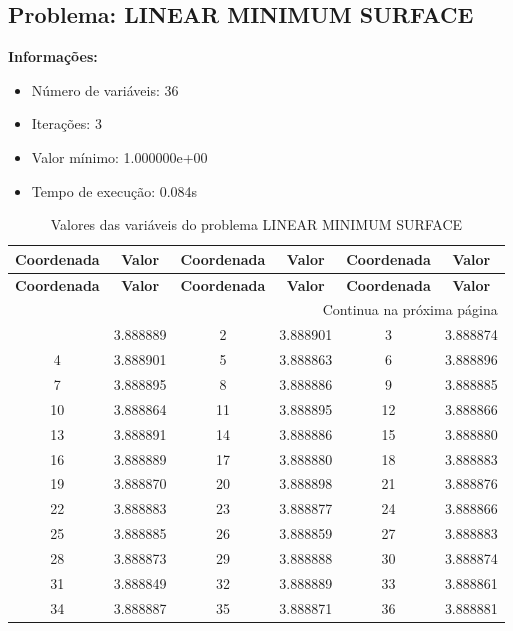 \documentclass[12pt]{article}
\begin{document}
\newpage            
\subsection{Problema: LINEAR MINIMUM SURFACE}

\textbf{Informações:}
\begin{itemize}
\item Número de variáveis: 36
\item Iterações: 3
\item Valor mínimo: 1.000000e+00
\item Tempo de execução: 0.084s
\end{itemize}

\small
\begin{longtable}{@{}cc|cc|cc@{}}
\caption{Valores das variáveis do problema LINEAR MINIMUM SURFACE} \\
\toprule
\textbf{Coordenada} & \textbf{Valor} & \textbf{Coordenada} & \textbf{Valor} & \textbf{Coordenada} & \textbf{Valor} \\
\midrule
\endfirsthead

\toprule
\textbf{Coordenada} & \textbf{Valor} & \textbf{Coordenada} & \textbf{Valor} & \textbf{Coordenada} & \textbf{Valor} \\
\midrule
\endhead

\midrule \multicolumn{6}{r}{{Continua na próxima página}} \\ \midrule
\endfoot

\bottomrule
\endlastfoot
1 & 3.888889 & 2 & 3.888901 & 3 & 3.888874 \\
4 & 3.888901 & 5 & 3.888863 & 6 & 3.888896 \\
7 & 3.888895 & 8 & 3.888886 & 9 & 3.888885 \\
10 & 3.888864 & 11 & 3.888895 & 12 & 3.888866 \\
13 & 3.888891 & 14 & 3.888886 & 15 & 3.888880 \\
16 & 3.888889 & 17 & 3.888880 & 18 & 3.888883 \\
19 & 3.888870 & 20 & 3.888898 & 21 & 3.888876 \\
22 & 3.888883 & 23 & 3.888877 & 24 & 3.888866 \\
25 & 3.888885 & 26 & 3.888859 & 27 & 3.888883 \\
28 & 3.888873 & 29 & 3.888888 & 30 & 3.888874 \\
31 & 3.888849 & 32 & 3.888889 & 33 & 3.888861 \\
34 & 3.888887 & 35 & 3.888871 & 36 & 3.888881 \\

\end{longtable}
\end{document}
